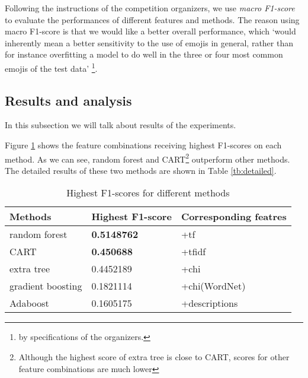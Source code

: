 \documentclass[english, table, latin9]{article}
\begin{document}
\par Following the instructions of the competition organizers, we use \emph{macro F1-score} to evaluate the performances of different features and methods. The reason using macro F1-score is that we would like a better overall performance, which `would inherently mean a better sensitivity to the use of emojis in general, rather than for instance overfitting a model to do well in the three or four most common emojis of the test data' \footnote{by specifications of the organizers.}.


\subsection{Results and analysis}
In this subsection we will talk about results of the experiments.

\par Figure \ref{tb:difmethods} shows the feature combinations receiving highest F1-scores on each method. As we can see, random forest and CART\footnote{Although the highest score of extra tree is close to CART, scores for other feature combinations are much lower} outperform other methods. The detailed results of these two methods are shown in Table \ref{tb:detailed}.

\begin{table}[t]
\caption{Highest F1-scores for different methods}
\label{tb:difmethods}
\centering
\begin{tabularx}{350pt}{l|XX}
	\toprule
		\textbf{Methods} & \textbf{Highest F1-score} & \textbf{Corresponding featres} \\
	\midrule
		random forest & \textbf{0.5148762} & +tf \\
		CART & \textbf{0.450688} & +tfidf \\
		extra tree & 0.4452189 & +chi \\
		gradient boosting & 0.1821114 & +chi(WordNet) \\
		Adaboost & 0.1605175 & +descriptions \\
	\bottomrule
\end{tabularx}
\end{table}
\end{document}
